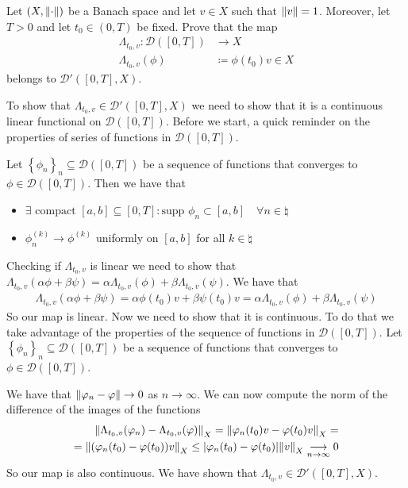 \newpage
\begin{exercise}
    Let \((X, \norm{\cdot})\) be a Banach space and let \(v \in X\) such that \(\norm{v} = 1\). Moreover, let \(T > 0\) and let \(t_0 \in (0, T)\) be fixed. Prove that the map 
    \begin{align*}
        \Lambda_{t_0, v} \colon \mathcal{D}([0, T]) &\to X \\
        \Lambda_{t_0, v}(\phi) &\coloneqq \phi(t_0) v \in X
    \end{align*}
    belongs to \(\mathcal{D}'([0, T], X)\).
\end{exercise}
To show that \(\Lambda_{t_0, v} \in \mathcal{D}'([0, T], X)\) we need to show that it is a continuous linear functional on \(\mathcal{D}([0, T])\). 
Before we start, a quick reminder on the properties of series of functions in \(\mathcal{D}([0, T])\).
\begin{remark}
    Let \(\left\{ \phi_n \right\}_{n} \subseteq \mathcal{D}([0, T])\) be a sequence of functions that converges to \(\phi \in \mathcal{D}([0, T])\). Then we have that
    \begin{itemize}
        \item \(\exists \text{ compact }[a, b] \subseteq [0, T] \colon \text{supp } \phi_n \subset [a, b] \quad \forall n \in \natural\)
        \item \(\phi_n^{(k)} \to \phi^{(k)}\) uniformly on \([a, b]\) for all \(k \in \natural\)
    \end{itemize}
\end{remark}
Checking if \(\Lambda_{t_0, v}\) is linear we need to show that \(\Lambda_{t_0, v}(\alpha \phi + \beta \psi) = \alpha \Lambda_{t_0, v}(\phi) + \beta \Lambda_{t_0, v}(\psi)\). We have that
\[
    \begin{split}
        \Lambda_{t_0, v}(\alpha \phi + \beta \psi) = \alpha \phi(t_0) v + \beta \psi(t_0) v = \alpha \Lambda_{t_0, v}(\phi) + \beta \Lambda_{t_0, v}(\psi)
    \end{split}
\]
So our map is linear. Now we need to show that it is continuous. 
To do that we take advantage of the properties of the sequence of functions in \(\mathcal{D}([0, T])\). Let \(\left\{ \phi_n \right\}_{n} \subseteq \mathcal{D}([0, T])\) be a sequence of functions that converges to \(\phi \in \mathcal{D}([0, T])\). 

We have that \(\norm{\varphi_n - \varphi} \to 0\) as \(n \to \infty\). We can now compute the norm of the difference of the images of the functions
\[
    \begin{split}
        \norm{\Lambda_{t_0, v}(\varphi_n) - \Lambda_{t_0, v}(\varphi)}_X = \norm{\varphi_n(t_0) v - \varphi(t_0) v}_X =\\
        = \norm{(\varphi_n(t_0) - \varphi(t_0)) v}_X \leq \abs{\varphi_n(t_0) - \varphi(t_0)} \norm{v}_X \underset{n \to \infty}{\longrightarrow} 0
    \end{split}
\]
So our map is also continuous. We have shown that \(\Lambda_{t_0, v} \in \mathcal{D}'([0, T], X)\).

